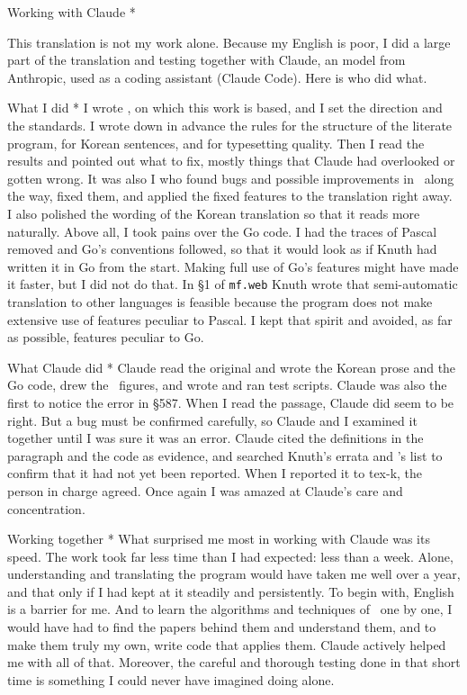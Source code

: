 {\quad Working with Claude *

This translation is not my work alone. Because my English is poor, I
did a large part of the translation and testing together with Claude,
an  model from Anthropic, used as a coding assistant (Claude
Code). Here is who did what.

\subhead * What I did *
I wrote \GWEB, on which this work is based, and I set the direction
and the standards. I wrote down in advance the rules for the structure
of the literate program, for Korean sentences, and for typesetting
quality. Then I read the results and pointed out what to fix, mostly
things that Claude had overlooked or gotten wrong. It was also I who
found bugs and possible improvements in \GWEB\ along the way, fixed
them, and applied the fixed features to the translation right away. I
also polished the wording of the Korean translation so that it reads
more naturally.
Above all, I took pains over the Go code. I had the traces of Pascal
removed and Go's conventions followed, so that it would look as if
Knuth had written it in Go from the start. Making full use of Go's
features might have made it faster, but I did not do that. In \S1 of
{\tt mf.web} Knuth wrote that semi-automatic translation to other
languages is feasible because the program does not make extensive use
of features peculiar to Pascal. I kept that spirit and avoided, as far
as possible, features peculiar to Go.

\subhead * What Claude did *
Claude read the original and wrote the Korean prose and the Go code,
drew the \MP\ figures, and wrote and ran test scripts. Claude was also
the first to notice the error in \S587. When I read the passage,
Claude did seem to be right. But a bug must be confirmed carefully, so
Claude and I examined it together until I was sure it was an error.
Claude cited the definitions in the paragraph and the code as
evidence, and searched Knuth's errata and 's list to
confirm that it had not yet been reported.
When I reported it to tex-k, the person in charge agreed. Once again I
was amazed at Claude's care and concentration.

\subhead * Working together *
What surprised me most in working with Claude was its speed. The work
took far less time than I had expected: less than a week. Alone,
understanding and translating the program would have taken me well
over a year, and that only if I had kept at it steadily and
persistently. To begin with, English is a barrier for me. And to learn
the algorithms and techniques of \MF\ one by one, I would have had to
find the papers behind them and understand them, and to make them truly
my own, write code that applies them. Claude actively helped me with
all of that. Moreover, the careful and thorough testing done in that
short time is something I could never have imagined doing alone.

}

